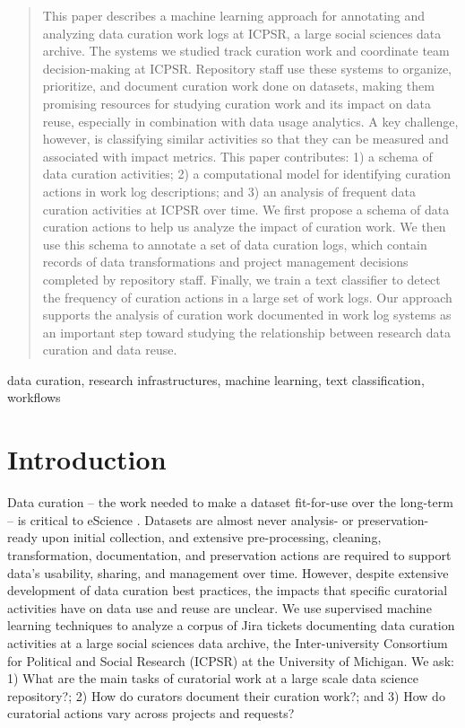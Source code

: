 \documentclass[conference]{IEEEtran}
\begin{document}
\begin{abstract}
This paper describes a machine learning approach for annotating and analyzing data curation work logs at ICPSR, a large social sciences data archive. The systems we studied track curation work and coordinate team decision-making at ICPSR. Repository staff use these systems to organize, prioritize, and document curation work done on datasets, making them promising resources for studying curation work and its impact on data reuse, especially in combination with data usage analytics. A key challenge, however, is classifying similar activities so that they can be measured and associated with impact metrics. This paper contributes: 1) a schema of data curation activities; 2) a computational model for identifying curation actions in work log descriptions; and 3) an analysis of frequent data curation activities at ICPSR over time. We first propose a schema of data curation actions to help us analyze the impact of curation work. We then use this schema to annotate a set of data curation logs, which contain records of data transformations and project management decisions completed by repository staff. Finally, we train a text classifier to detect the frequency of curation actions in a large set of work logs. Our approach supports the analysis of curation work documented in work log systems as an important step toward studying the relationship between research data curation and data reuse.
\end{abstract}

\begin{IEEEkeywords}
data curation, research infrastructures, machine learning, text classification, workflows
\end{IEEEkeywords}

\section{Introduction}
\label{introduction}
Data curation – the work needed to make a dataset fit-for-use over the long-term – is critical to eScience \cite{Lord2004-zr, Pennock2007-eb, Goble2008-vn, Palmer2011-ud, Johnston2017-cq}. Datasets are almost never analysis- or preservation-ready upon initial collection, and extensive pre-processing, cleaning, transformation, documentation, and preservation actions are required to support data’s usability, sharing, and management over time. However, despite extensive development of data curation best practices, the impacts that specific curatorial activities have on data use and reuse are unclear. We use supervised machine learning techniques to analyze a corpus of Jira tickets documenting data curation activities at a large social sciences data archive, the Inter-university Consortium for Political and Social Research (ICPSR) at the University of Michigan. We ask: 1) What are the main tasks of curatorial work at a large scale data science repository?; 2) How do curators document their curation work?; and 3) How do curatorial actions vary across projects and requests?
\end{document}
